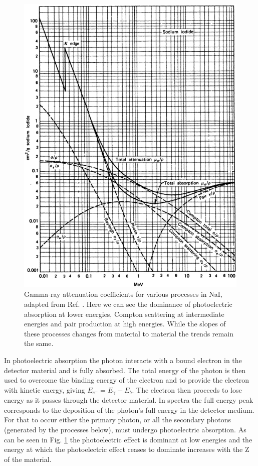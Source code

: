 \begin{figure}
	\centerline{\includegraphics[height=0.65\textheight]{./img/c3/gamma_interactions_scan.eps}}
	\caption{Gamma-ray attenuation coefficients for various processes in NaI, adapted from Ref. \cite{knollBook}. Here we can see the dominance of photoelectric absorption at lower energies, Compton scattering at intermediate energies and pair production at high energies. While the slopes of these processes changes from material to material the trends remain the same.}
	\label{fig:chp3-gamma-interactions}
\end{figure}

In photoelectric absorption the photon interacts with a bound electron in the detector material and is fully absorbed\cite{einstein-PE}. The total energy of the photon is then used to overcome the binding energy of the electron and to provide the electron with kinetic energy, giving $E_{e^-}=E_{\gamma}-E_b$. The electron then proceeds to lose energy as it passes through the detector material. In \gr{} spectra the full energy peak corresponds to the deposition of the photon's full energy in the detector medium. For that to occur either the primary photon, or all the secondary photons (generated by the processes below), must undergo photoelectric absorption. As can be seen in Fig. \ref{fig:chp3-gamma-interactions} the photoelectric effect is dominant at low energies and the energy at which the photoelectric effect ceases to dominate increases with the Z of the material.

